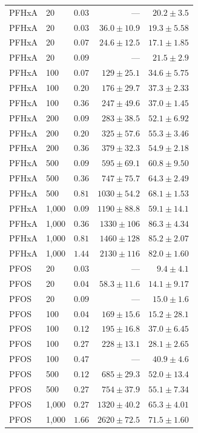 \begin{longtable}{llrrr}
\midrule
PFHxA & 20 & $0.03$ & --- & $20.2 \pm 3.5$ \\
PFHxA & 20 & $0.03$ & $36.0 \pm 10.9$ & $19.3 \pm 5.58$ \\
PFHxA & 20 & $0.07$ & $24.6 \pm 12.5$ & $17.1 \pm 1.85$ \\
PFHxA & 20 & $0.09$ & --- & $21.5 \pm 2.9$ \\
PFHxA & 100 & $0.07$ & $129 \pm 25.1$ & $34.6 \pm 5.75$ \\
PFHxA & 100 & $0.20$ & $176 \pm 29.7$ & $37.3 \pm 2.33$ \\
PFHxA & 100 & $0.36$ & $247 \pm 49.6$ & $37.0 \pm 1.45$ \\
PFHxA & 200 & $0.09$ & $283 \pm 38.5$ & $52.1 \pm 6.92$ \\
PFHxA & 200 & $0.20$ & $325 \pm 57.6$ & $55.3 \pm 3.46$ \\
PFHxA & 200 & $0.36$ & $379 \pm 32.3$ & $54.9 \pm 2.18$ \\
PFHxA & 500 & $0.09$ & $595 \pm 69.1$ & $60.8 \pm 9.50$ \\
PFHxA & 500 & $0.36$ & $747 \pm 75.7$ & $64.3 \pm 2.49$ \\
PFHxA & 500 & $0.81$ & $1030 \pm 54.2$ & $68.1 \pm 1.53$ \\
PFHxA & 1,000 & $0.09$ & $1190 \pm 88.8$ & $59.1 \pm 14.1$ \\
PFHxA & 1,000 & $0.36$ & $1330 \pm 106$ & $86.3 \pm 4.34$ \\
PFHxA & 1,000 & $0.81$ & $1460 \pm 128$ & $85.2 \pm 2.07$ \\
PFHxA & 1,000 & $1.44$ & $2130 \pm 116$ & $82.0 \pm 1.60$ \\
\midrule
PFOS & 20 & $0.03$ & --- & $9.4 \pm 4.1$ \\
PFOS & 20 & $0.04$ & $58.3 \pm 11.6$ & $14.1 \pm 9.17$ \\
PFOS & 20 & $0.09$ & --- & $15.0 \pm 1.6$ \\
PFOS & 100 & $0.04$ & $169 \pm 15.6$ & $15.2 \pm 28.1$ \\
PFOS & 100 & $0.12$ & $195 \pm 16.8$ & $37.0 \pm 6.45$ \\
PFOS & 100 & $0.27$ & $228 \pm 13.1$ & $28.1 \pm 2.65$ \\
PFOS & 100 & $0.47$ & --- & $40.9 \pm 4.6$ \\
PFOS & 500 & $0.12$ & $685 \pm 29.3$ & $52.0 \pm 13.4$ \\
PFOS & 500 & $0.27$ & $754 \pm 37.9$ & $55.1 \pm 7.34$ \\
PFOS & 1,000 & $0.27$ & $1320 \pm 40.2$ & $65.3 \pm 4.01$ \\
PFOS & 1,000 & $1.66$ & $2620 \pm 72.5$ & $71.5 \pm 1.60$ \\
\end{longtable}
\endgroup
